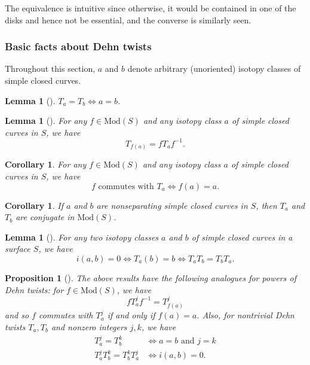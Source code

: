 \documentclass[reqno]{amsart}
\newtheorem{lemma}[theorem]{Lemma}
\newtheorem{proposition}[theorem]{Proposition}
\newtheorem{corollary}[theorem]{Corollary}
\theoremstyle{definition}
\theoremstyle{remark}
\newcommand{\Mod}{{\mathrm{Mod}}}
\begin{document}
The equivalence is intuitive since otherwise, it would be
contained in one of the disks and hence not be essential, and
the converse is similarly seen.


\subsubsection{Basic facts about Dehn twists}

Throughout this section, $a$ and $b$ denote arbitrary
(unoriented) isotopy classes of simple closed curves.

\begin{lemma}[]
    $T_a = T_b \iff a = b$.
\end{lemma}

\begin{lemma}[]
    For any $f \in \Mod(S)$ and any isotopy class $a$ of
    simple closed curves in $S$, we have
    \[
    T_{f(a)} = f T_a f^{-1}.
    \] 
\end{lemma}


\begin{corollary}
    For any $f \in \Mod(S)$ and any isotopy class $a$ of simple
    closed curves in $S$, we have
    \[
    f \text{ commutes with }T_a \iff
    f(a) = a.
    \] 
\end{corollary}

\begin{corollary}
    If $a$ and $b$ are nonseparating simple closed curves
    in $S$, then $T_a$ and $T_b$ are conjugate in
    $\Mod(S)$.
\end{corollary}

\begin{lemma}[]\label{dehn-intersection-0}
    For any two isotopy classes $a$ and $b$ of simple
    closed curves in a surface $S$, we have
    \[
    i(a,b) = 0 \iff T_a(b) = b \iff
    T_a T_b = T_b T_a.
    \] 
\end{lemma}

\begin{proposition}[]
    The above results have the following analogues for
    powers of Dehn twists:
    for $f \in \Mod(S)$, we have
    \[
    f T_a^{j} f^{-1} = T_{f(a)}^{j}
    \] 
    and so $f$ commutes with $T_a^{j}$ if and only if
    $f(a) = a$. Also, for nontrivial Dehn
    twists $T_a, T_b$ and nonzero integers $j,k$, we have
    \begin{align*}
        T_a^{j} = T_b^{k} &\iff a=b \text{ and } j=k\\
        T_a^{j} T_b^{k} = T_b^{k} T_a^{j} &\iff i(a,b) =0.
    \end{align*}
\end{proposition}
\end{document}
